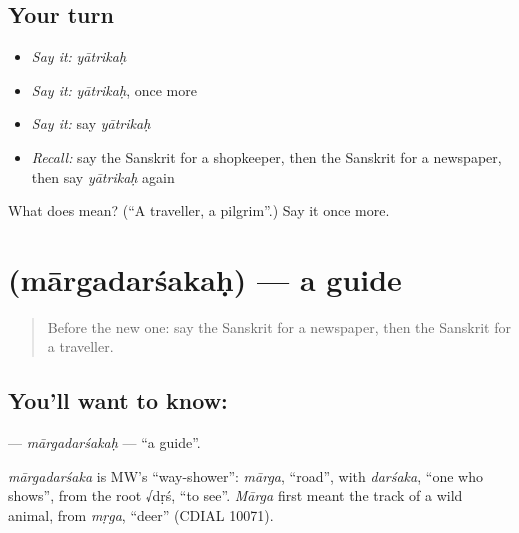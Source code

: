 \subsection*{Your turn}
\begin{itemize}
\raggedright
  \item \emph{Say it:} \emph{yātrikaḥ}
  \item \emph{Say it:} \emph{yātrikaḥ}, once more
  \item \emph{Say it:} say \emph{yātrikaḥ}
  \item \emph{Recall:} say the Sanskrit for a shopkeeper, then the Sanskrit for a newspaper, then say \emph{yātrikaḥ} again
\end{itemize}

\begin{tcolorbox}[breakable,colback=teal!4,colframe=teal!35!black,title={Before you move on}]
What does  mean? (\textquotedblleft{}A traveller, a pilgrim\textquotedblright{}.) Say it once more.
\end{tcolorbox}
\section[\texorpdfstring{\sk{मार्गदर्शकः} (mārgadarśakaḥ)}{मार्गदर्शकः (mārgadarśakaḥ)}]{ (mārgadarśakaḥ) — a guide}

\label{lesson:SA-C223-margadarsakah}



\begin{quote}
Before the new one: say the Sanskrit for a newspaper, then the Sanskrit for a traveller.
\end{quote}

\subsection*{You'll want to know: }
\textbf{} — \emph{mārgadarśakaḥ} — \textquotedblleft{}a guide\textquotedblright{}.

\begin{cousinweb}
\emph{mārgadarśaka} is MW's \textquotedblleft{}way-shower\textquotedblright{}: \emph{mārga}, \textquotedblleft{}road\textquotedblright{}, with \emph{darśaka}, \textquotedblleft{}one who shows\textquotedblright{}, from the root √dṛś, \textquotedblleft{}to see\textquotedblright{}. \emph{Mārga} first meant the track of a wild animal, from \emph{mṛga}, \textquotedblleft{}deer\textquotedblright{} (CDIAL 10071).
\end{cousinweb}

